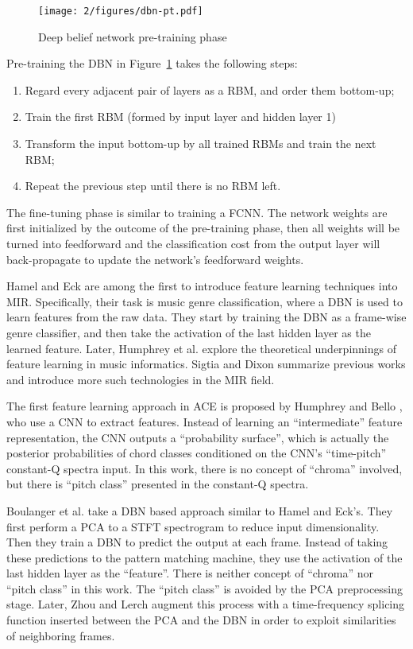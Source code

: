 \begin{figure}[htb]
\centering
\texttt{[image: 2/figures/dbn-pt.pdf]}
\caption{Deep belief network pre-training phase}
\label{fig:2-dbn-pt}
\end{figure}
Pre-training the DBN in Figure~\ref{fig:2-dbn-pt} takes the following steps:
\begin{enumerate}
\item Regard every adjacent pair of layers as a RBM, and order them bottom-up;
\item Train the first RBM (formed by input layer and hidden layer 1)
\item Transform the input bottom-up by all trained RBMs and train the next RBM;
\item Repeat the previous step until there is no RBM left.
\end{enumerate}
The fine-tuning phase is similar to training a FCNN. The network weights are first initialized by the outcome of the pre-training phase, then all weights will be turned into feedforward and the classification cost from the output layer will back-propagate to update the network's feedforward weights.

Hamel and Eck \cite{hamel2010learning} are among the first to introduce feature learning techniques into MIR. Specifically, their task is music genre classification, where a DBN is used to learn features from the raw data. They start by training the DBN as a frame-wise genre classifier, and then take the activation of the last hidden layer as the learned feature. Later, Humphrey et al. \cite{humphrey2013feature} explore the theoretical underpinnings of feature learning in music informatics. Sigtia and Dixon \cite{sigtia2014improved} summarize previous works and introduce more such technologies in the MIR field.

The first feature learning approach in ACE is proposed by Humphrey and Bello \cite{humphrey2012rethinking}, who use a CNN to extract features. Instead of learning an ``intermediate'' feature representation, the CNN outputs a ``probability surface'', which is actually the posterior probabilities of chord classes conditioned on the CNN's ``time-pitch'' constant-Q spectra input. In this work, there is no concept of ``chroma'' involved, but there is ``pitch class'' presented in the constant-Q spectra.

Boulanger et al. \cite{boulanger2013audio} take a DBN based approach similar to Hamel and Eck's. They first perform a PCA to a STFT spectrogram to reduce input dimensionality. Then they train a DBN to predict the output at each frame. Instead of taking these predictions to the pattern matching machine, they use the activation of the last hidden layer as the ``feature''. There is neither concept of ``chroma'' nor ``pitch class'' in this work. The ``pitch class'' is avoided by the PCA preprocessing stage. Later, Zhou and Lerch \cite{zhou2015chord} augment this process with a time-frequency splicing function inserted between the PCA and the DBN in order to exploit similarities of neighboring frames.

